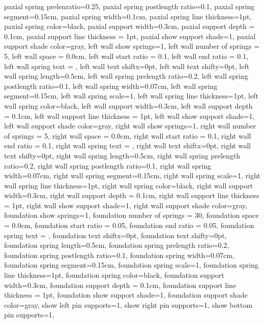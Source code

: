 {{  paxial spring prelenratio=0.25,
  paxial spring postlength ratio=0.1,
  paxial spring segment=0.15cm,
  paxial spring width=0.1cm,
  paxial spring line thickness=1pt,
  paxial spring color=black,
  paxial support width=0.3cm,
  paxial support depth = 0.1cm,
  paxial support line thickness = 1pt,
  paxial show support shade=1,
  paxial support shade color=gray,
  left wall show springs=1,
  left wall number of springs = 5,
  left wall space = 0.0cm,
  left wall start ratio = 0.1,
  left wall end ratio = 0.1,
  left wall spring text = {},
  left wall text shiftx=0pt,
  left wall text shifty=0pt,
  left wall spring length=0.5cm,
  left wall spring prelength ratio=0.2,
  left wall spring postlength ratio=0.1,
  left wall spring width=0.07cm,
  left wall spring segment=0.15cm,
  left wall spring scale=1,
  left wall spring line thickness=1pt,
  left wall spring color=black,
  left wall support width=0.3cm,
  left wall support depth = 0.1cm,
  left wall support line thickness = 1pt,
  left wall show support shade=1,
  left wall support shade color=gray,
  right wall show springs=1,
  right wall number of springs = 5,
  right wall space = 0.0cm,
  right wall start ratio = 0.1,
  right wall end ratio = 0.1,
  right wall spring text = {},
  right wall text shiftx=0pt,
  right wall text shifty=0pt,
  right wall spring length=0.5cm,
  right wall spring prelength ratio=0.2,
  right wall spring postlength ratio=0.1,
  right wall spring width=0.07cm,
  right wall spring segment=0.15cm,
  right wall spring scale=1,
  right wall spring line thickness=1pt,
  right wall spring color=black,
  right wall support width=0.3cm,
  right wall support depth = 0.1cm,
  right wall support line thickness = 1pt,
  right wall show support shade=1,
  right wall support shade color=gray,
  foundation show springs=1,
  foundation number of springs = 30,
  foundation space = 0.0cm,
  foundation start ratio = 0.05,
  foundation end ratio = 0.05,
  foundation spring text = {},
  foundation text shiftx=0pt,
  foundation text shifty=0pt,
  foundation spring length=0.5cm,
  foundation spring prelength ratio=0.2,
  foundation spring postlength ratio=0.1,
  foundation spring width=0.07cm,
  foundation spring segment=0.15cm,
  foundation spring scale=1,
  foundation spring line thickness=1pt,
  foundation spring color=black,
  foundation support width=0.3cm,
  foundation support depth = 0.1cm,
  foundation support line thickness = 1pt,
  foundation show support shade=1,
  foundation support shade color=gray,
  show left pin supports=1,
  show right pin supports=1,
  show bottom pin supports=1,
}}
